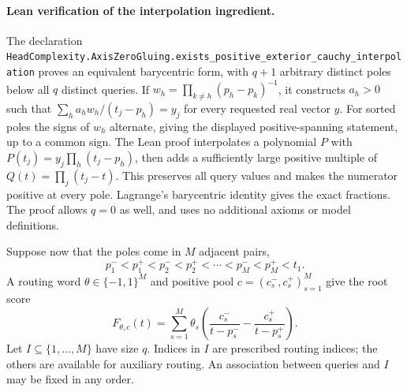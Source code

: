 \documentclass[11pt]{article}
\begin{document}
\paragraph{Lean verification of the interpolation ingredient.}
The declaration
\texttt{HeadComplexity.AxisZeroGluing.exists\_positive\_exterior\_cauchy\_interpolation}
proves an equivalent barycentric form, with $q+1$ arbitrary distinct
poles below all $q$ distinct queries. If
$w_h=\prod_{k\ne h}(p_h-p_k)^{-1}$, it constructs $a_h>0$ such that
$\sum_h a_hw_h/(t_j-p_h)=y_j$ for every requested real vector $y$.
For sorted poles the signs of $w_h$ alternate, giving the displayed
positive-spanning statement, up to a common sign.
The Lean proof interpolates a polynomial $P$ with
$P(t_j)=y_j\prod_h(t_j-p_h)$, then adds a sufficiently large positive
multiple of $Q(t)=\prod_j(t_j-t)$. This preserves all query values
and makes the numerator positive at every pole. Lagrange's
barycentric identity gives the exact fractions. The proof allows
$q=0$ as well, and uses no additional axioms or model definitions.

Suppose now that the poles come in $M$ adjacent pairs,
\[
 p_1^-<p_1^+<p_2^-<p_2^+<\cdots<p_M^-<p_M^+<t_1.
                                                               \tag{1}
\]
A routing word $\theta\in\{-1,1\}^M$ and positive pool
$c=(c_s^-,c_s^+)_{s=1}^M$ give the root score
\[
 F_{\theta,c}(t)=\sum_{s=1}^M\theta_s
       \left(\frac{c_s^-}{t-p_s^-}
                     -\frac{c_s^+}{t-p_s^+}\right).            \tag{2}
\]
Let $I\subseteq\{1,\ldots,M\}$ have size $q$. Indices in $I$ are
prescribed routing indices; the others are available for auxiliary
routing. An association between queries and $I$ may be fixed in
any order.
\end{document}

